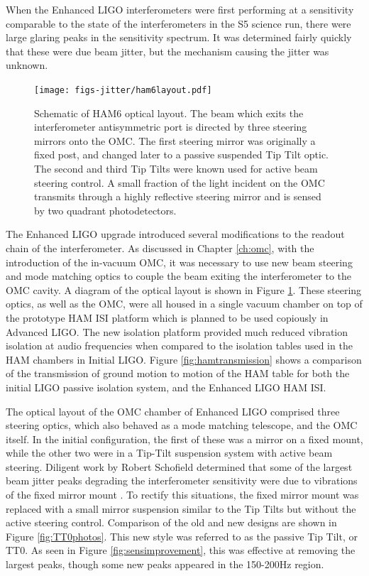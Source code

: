 When the Enhanced LIGO interferometers were first performing at a sensitivity comparable to the state of the interferometers in the S5 science run, there were large glaring peaks in the sensitivity spectrum. %
It was determined fairly quickly that these were due beam jitter, but the mechanism causing the jitter was unknown.

\begin{figure}
  \begin{center}
  \leavevmode
  \texttt{[image: figs-jitter/ham6layout.pdf]}
  \end{center}
  \caption[Schematic of HAM6 optical layout.]{Schematic of HAM6 optical layout. The beam which exits the interferometer antisymmetric port is directed by three steering mirrors onto the OMC. The first steering mirror was originally a fixed post, and changed later to a passive suspended Tip Tilt optic. The second and third Tip Tilts were known used for active beam steering control. A small fraction of the light incident on the OMC transmits through a highly reflective steering mirror and is sensed by two quadrant photodetectors.}
  \label{fig:ham6layout}
\end{figure}

The Enhanced LIGO upgrade introduced several modifications to the readout chain of the interferometer. %
As discussed in Chapter \ref{ch:omc}, with the introduction of the in-vacuum OMC, it was necessary to use new beam steering and mode matching optics to couple the beam exiting the interferometer to the OMC cavity. %
A diagram of the optical layout is shown in Figure \ref{fig:ham6layout}. %
These steering optics, as well as the OMC, were all housed in a single vacuum chamber on top of the prototype HAM ISI platform which is planned to be used copiously in Advanced LIGO. %
The new isolation platform provided much reduced vibration isolation at audio frequencies when compared to the isolation tables used in the HAM chambers in Initial LIGO. %
Figure \ref{fig:hamtransmission} shows a comparison of the transmission of ground motion to motion of the HAM table for both the initial LIGO passive isolation system, and the Enhanced LIGO HAM ISI.

The optical layout of the OMC chamber of Enhanced LIGO comprised three steering optics, which also behaved as a mode matching telescope, and the OMC itself. %
In the initial configuration, the first of these was a mirror on a fixed mount, while the other two were in a Tip-Tilt suspension system with active beam steering. %
Diligent work by Robert Schofield determined that some of the largest beam jitter peaks degrading the interferometer sensitivity were due to vibrations of the fixed mirror mount \cite{fixedmountpeaks}. %
To rectify this situations, the fixed mirror mount was replaced with a small mirror suspension similar to the Tip Tilts but without the active steering control. %
Comparison of the old and new designs are shown in Figure \ref{fig:TT0photos}. %
This new style was referred to as the passive Tip Tilt, or TT0. %
As seen in Figure \ref{fig:sensimprovement}, this was effective at removing the largest peaks, though some new peaks appeared in the 150-200Hz region.


